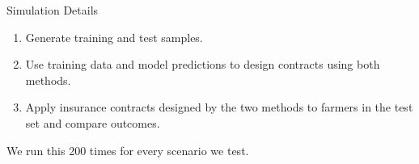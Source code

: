 \documentclass{beamer}
\begin{document}


\begin{frame}{Simulation Details}
    \begin{enumerate}
        \setlength\itemsep{2em}
        \item Generate training and test samples.
        \item Use training data and model predictions to design contracts using both methods.  
        \item Apply insurance contracts designed by the two methods to farmers in the test set and compare outcomes.
        \end{enumerate}
    We run this 200 times for every scenario we test. 
\end{frame}
\end{document}
